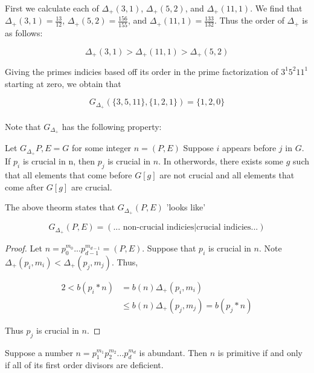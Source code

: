 \documentclass[../paper.tex]{subfiles}
\begin{document}
First we calculate each of $\Delta_{+}(3,1)$, $\Delta_{+}(5,2)$, 
and $\Delta_{+}(11,1)$. We find that 
$\Delta_{+}(3,1) = \frac{13}{12}$,
$\Delta_{+}(5,2) = \frac{156}{155}$, and
$\Delta_{+}(11,1)= \frac{133}{132}$.
Thus the order of $\Delta_{+}$ is as follows:

$$ \Delta_{+}(3,1) > \Delta_{+}(11,1) > \Delta_{+}(5,2)$$

Giving the primes indicies based off its order in the prime
factorization of $3^1 5^2 11^1$ starting at zero, we obtain that

$$G_{\Delta_{+}}(\{3,5,11\}, \{1,2,1\}) = \{1,2,0\}$$
\\

Note that $G_{\Delta_+}$ has the following property:

\begin{theorem}\label{crucial_thm}
Let $G_{\Delta_+}{P,E} = G$ for some integer $n = (P,E)$
Suppose $i$ appears before $j$ in $G$. If $p_i$ is crucial in n,
then $p_j$ is crucial in $n$. In otherwords, there exists some $g$
such that all elements that come before $G[g]$ are not crucial and
all elements that come after $G[g]$ are crucial.
\end{theorem}

The above theorm states that $G_{\Delta_+}(P,E)$ 'looks like'

$$ G_{\Delta_+}(P, E) = (\text{... non-crucial indicies} 
                        | \text{crucial indicies...}) $$

\begin{proof}

Let $n = p_0^{m_0} ... p_{d-1}^{m_{d-1}} = (P, E)$. Suppose that
$p_i$ is crucial in $n$. Note $\Delta_+(p_i, m_i) < \Delta_+(p_j,
m_j)$. Thus,

\begin{equation}
\begin{split}
2 < b(p_i * n) & = b(n)\Delta_+(p_i, m_i) \\
               & \leq b(n)\Delta_+(p_j, m_j) = b(p_j * n)
\end{split}
\end{equation}

Thus $p_j$ is crucial in $n$.

\end{proof}


\begin{theorem}\label{del_minus_thm}
Suppose a number $n = p_1^{m_1} p_2^{m_2} ... p_d^{m_d}$ is 
abundant. Then $n$ is primitive if and only if all of its first
order divisors are deficient.
\end{theorem}
\end{document}
